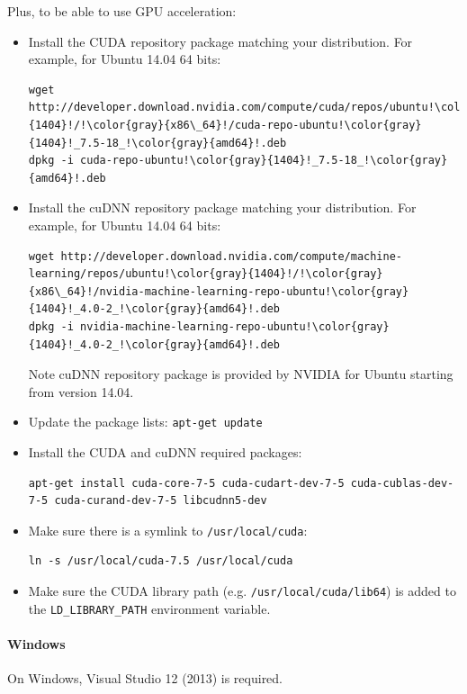 \documentclass[a4paper,11pt,oneside]{article}
\newenvironment{myitemize}
{ \begin{itemize}
    \setlength{\itemsep}{0pt}
    \setlength{\parskip}{0pt}
    \setlength{\parsep}{0pt}     }
{ \end{itemize}                  }
\begin{document}
Plus, to be able to use GPU acceleration:
\begin{myitemize}
    \item Install the CUDA repository package matching your distribution. For
    example, for Ubuntu 14.04 64 bits:
\begin{lstlisting}[escapechar=!]
wget http://developer.download.nvidia.com/compute/cuda/repos/ubuntu!\color{gray}{1404}!/!\color{gray}{x86\_64}!/cuda-repo-ubuntu!\color{gray}{1404}!_7.5-18_!\color{gray}{amd64}!.deb
dpkg -i cuda-repo-ubuntu!\color{gray}{1404}!_7.5-18_!\color{gray}{amd64}!.deb
\end{lstlisting}
    \item Install the cuDNN repository package matching your distribution. For
    example, for Ubuntu 14.04 64 bits:
\begin{lstlisting}[escapechar=!]
wget http://developer.download.nvidia.com/compute/machine-learning/repos/ubuntu!\color{gray}{1404}!/!\color{gray}{x86\_64}!/nvidia-machine-learning-repo-ubuntu!\color{gray}{1404}!_4.0-2_!\color{gray}{amd64}!.deb
dpkg -i nvidia-machine-learning-repo-ubuntu!\color{gray}{1404}!_4.0-2_!\color{gray}{amd64}!.deb
\end{lstlisting}
    Note cuDNN repository package is provided by NVIDIA for Ubuntu starting
    from version 14.04.
    \item Update the package lists: \lstinline!apt-get update!
    \item Install the CUDA and cuDNN required packages:
\begin{lstlisting}[escapechar=!]
apt-get install cuda-core-7-5 cuda-cudart-dev-7-5 cuda-cublas-dev-7-5 cuda-curand-dev-7-5 libcudnn5-dev
\end{lstlisting}
    \item Make sure there is a symlink to \lstinline!/usr/local/cuda!:
\begin{lstlisting}[escapechar=!]
ln -s /usr/local/cuda-7.5 /usr/local/cuda
\end{lstlisting}
    \item Make sure the CUDA library path (e.g. {\tt{}/usr/local/cuda/lib64}) is
     added to the {\tt{}LD\_LIBRARY\_PATH} environment variable.
\end{myitemize}

\paragraph{Windows}

On Windows, Visual Studio 12 (2013) is required.
\end{document}
